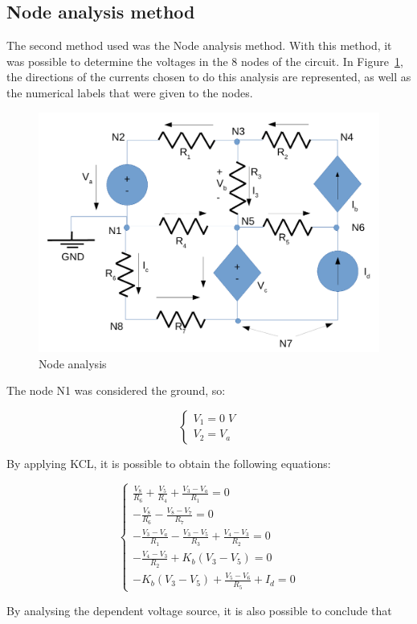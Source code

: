 \subsection{Node analysis method}
\label{sec:node}

The second method used was the Node analysis method. With this method, it was possible to determine the voltages in the 8 nodes of the circuit. In Figure~\ref{node_fig}, the directions of the currents chosen to do this analysis are represented, as well as the numerical labels that were given to the nodes.

\begin{figure}[H]
  \centering
  \includegraphics[width=0.5\linewidth]{node.pdf}
  \caption{Node analysis}
  \label{node_fig}
\end{figure}

The node N1 was considered the ground, so:

\begin{equation}
  \begin{cases}
    V_1 = 0 \; V \\
    V_2 = V_a
  \end{cases}
\end{equation}

By applying KCL, it is possible to obtain the following equations:

\begin{equation}
  \begin{cases}
    \frac{V_8}{R_6} + \frac{V_5}{R_4} + \frac{V_3-V_a}{R_1} = 0 \\
    -\frac{V_8}{R_6} - \frac{V_8-V_7}{R_7} = 0 \\
    -\frac{V_3-V_a}{R_1} - \frac{V_3-V_5}{R_3} + \frac{V_4-V_3}{R_2} = 0 \\
    -\frac{V_4-V_3}{R_2} + K_b(V_3-V_5) = 0 \\
    -K_b(V_3-V_5) + \frac{V_5-V_6}{R_5} + I_d = 0
  \end{cases}
\end{equation}

By analysing the dependent voltage source, it is also possible to conclude that

